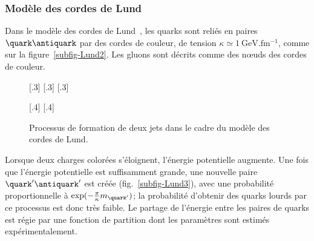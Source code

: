 \subsubsection{Modèle des cordes de Lund}\label{chapter-JERC-section-jets-subsec-hadronisation-subsubsec-Lund}
Dans le modèle des cordes de Lund~\cite{Andersson_parton_fragmentation}, les quarks sont reliés en paires $\quark\antiquark$ par des \og cordes \fg{} de couleur, de tension $\kappa \simeq \SI{1}{\GeV.\femto\meter^{-1}}$, comme sur la figure~\ref{subfig-Lund2}. Les gluons sont décrits comme des nœuds des cordes de couleur.
\begin{figure}[h]
\centering
{}[.3\textwidth]
{}
\hfill
{}[.3\textwidth]
{}
\hfill
{}[.3\textwidth]
{}

\vspace{\baselineskip}

[.4\textwidth]
{}
\qquad\qquad
{}[.4\textwidth]
{}

\caption{Processus de formation de deux jets dans le cadre du modèle des cordes de Lund.}
\label{fig-Lund}
\end{figure}
\par Lorsque deux charges colorées s'éloignent, l'énergie potentielle augmente.
Une fois que l'énergie potentielle est suffisamment grande, une nouvelle paire $\quark'\antiquark'$ est créée (fig.~\ref{subfig-Lund3}), avec une probabilité proportionnelle à $\exp(-\frac{\pi}{\kappa} m_{\quark'})$; la probabilité d'obtenir des quarks lourds par ce processus est donc très faible.
Le partage de l'énergie entre les paires de quarks est régie par une fonction de partition dont les paramètres sont estimés expérimentalement.

